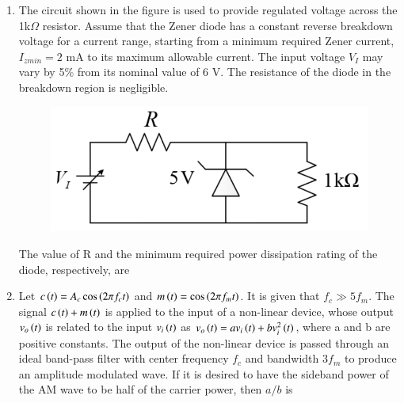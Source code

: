 \documentclass[a4paper, 11pt]{article}
\begin{document}
\begin{enumerate}
    \item The circuit shown in the figure is used to provide regulated voltage  across the 1k$\Omega$ resistor. Assume that the Zener diode has a constant reverse breakdown voltage for a current range, starting from a minimum required Zener current, $I_{zmin} = 2$ mA to its maximum allowable current. The input voltage $V_I$ may vary by 5\% from its nominal value of 6 V. The resistance of the diode in the breakdown region is negligible.
    \begin{figure}[H]
        \centering
        \includegraphics[width=0.5\columnwidth]{figs/q26.png}
        \caption*{}
        \label{fig:q26}
    \end{figure}
    The value of R and the minimum required power dissipation rating of the diode, respectively, are
    \begin{enumerate}
    \end{enumerate}

    \hfill{}

    \item Let $c\left(t\right)=A_c\cos\left(2\pi f_c t\right)$ and $m\left(t\right)=\cos\left(2\pi f_m t\right)$. It is given that $f_c \gg 5f_m$. The signal $c\left(t\right)+m\left(t\right)$ is applied to the input of a non-linear device, whose output $v_o\left(t\right)$ is related to the input $v_i\left(t\right)$ as $v_o\left(t\right) = av_i\left(t\right) + bv_i^2\left(t\right)$, where a and b are positive constants. The output of the non-linear device is passed through an ideal band-pass filter with center frequency $f_c$ and bandwidth $3f_m$ to produce an amplitude modulated  wave. If it is desired to have the sideband power of the AM wave to be half of the carrier power, then $a/b$ is
    \begin{enumerate}
    \end{enumerate}


\end{enumerate}
\end{document}
